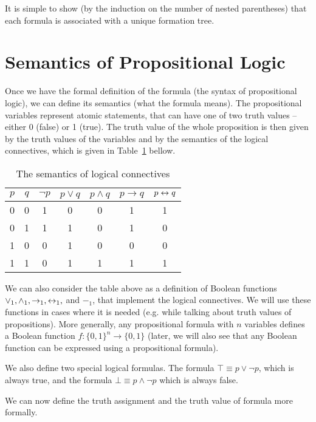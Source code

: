 It is simple to show (by the induction on the number of nested parentheses) that each formula is associated with a unique formation tree. 

\section{Semantics of Propositional Logic}

Once we have the formal definition of the formula (the syntax of propositional logic), we can define its semantics (what the formula means). The propositional variables represent atomic statements, that can have one of two truth values -- either 0 (false) or 1 (true). The truth value of the whole proposition is then given by the truth values of the variables and by the semantics of the logical connectives, which is given in Table~\ref{tab:prop_semantics} bellow.

\begin{table}[h]
\centering
\caption{The semantics of logical connectives}
\label{tab:prop_semantics}
\begin{tabular}{cc|ccccc}
\toprule
$p$ & $q$ & $\neg p$ & $p \lor q$ & $p \land q$ & $p \to q$ & $p \leftrightarrow q$ \\
\midrule
0 & 0 & 1 & 0 & 0 & 1 & 1 \\
0 & 1 & 1 & 1 & 0 & 1 & 0 \\
1 & 0 & 0 & 1 & 0 & 0 & 0 \\
1 & 1 & 0 & 1 & 1 & 1 & 1 \\
\bottomrule
\end{tabular}
\end{table}

We can also consider the table above as a definition of Boolean functions $\lor_1, \land_1, \to_1, \leftrightarrow_1,$ and $-_1$, that implement the logical connectives. We will use these functions in cases where it is needed (e.g. while talking about truth values of propositions). More generally, any propositional formula with $n$ variables defines a Boolean function $f: \{0,1\}^n \to \{0,1\}$ (later, we will also see that any Boolean function can be expressed using a propositional formula).

We also define two special logical formulas. The formula $\top \equiv p \lor \neg p$, which is always true, and the formula $\bot \equiv p \land \neg p$ which is always false.

We can now define the truth assignment and the truth value of formula more formally.

